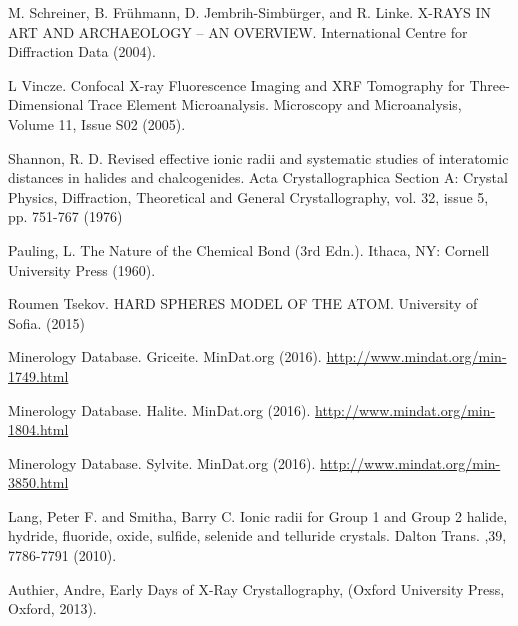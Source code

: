 \documentclass[%
 reprint,
 amsmath,amssymb,
 aps,
 pra,
]{revtex4-1}
\begin{document}
\begin{thebibliography}{6}
	M. Schreiner, B. Frühmann, D. Jembrih-Simbürger, and R. Linke. X-RAYS IN ART AND ARCHAEOLOGY – AN OVERVIEW.  International Centre for Diffraction Data (2004).
	
	L Vincze. Confocal X-ray Fluorescence Imaging and XRF Tomography for Three-Dimensional Trace Element Microanalysis. Microscopy and Microanalysis, Volume 11, Issue S02 (2005).
	
	Shannon, R. D. Revised effective ionic radii and systematic studies of interatomic distances in halides and chalcogenides. Acta Crystallographica Section A: Crystal Physics, Diffraction, Theoretical and General Crystallography, vol. 32, issue 5, pp. 751-767 (1976)
	
	Pauling, L. The Nature of the Chemical Bond (3rd Edn.). Ithaca, NY: Cornell University Press (1960).
	
	Roumen Tsekov. HARD SPHERES MODEL OF THE ATOM. University of Sofia. (2015)
	
	Minerology Database. Griceite. MinDat.org (2016). \url{http://www.mindat.org/min-1749.html}
	
	Minerology Database. Halite. MinDat.org (2016). \url{http://www.mindat.org/min-1804.html}
	
	Minerology Database. Sylvite. MinDat.org (2016). \url{http://www.mindat.org/min-3850.html}
	
	Lang, Peter F. and Smitha, Barry C. Ionic radii for Group 1 and Group 2 halide, hydride, fluoride, oxide, sulfide, selenide and telluride crystals. Dalton Trans. ,39, 7786-7791 (2010).
	
	Authier, Andre, Early Days of X-Ray Crystallography, (Oxford University Press, Oxford, 2013).


\end{thebibliography}
\end{document}
